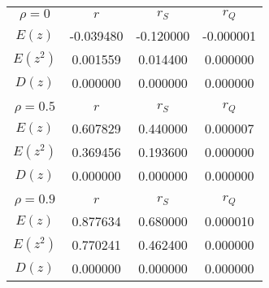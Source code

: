 \begin{table}[H]
    \centering
    \begin{tabular}{c|c|c|c}
        $$\rho=0$$ & $r$ & $r_{S}$ & $r_{Q}$ \\
        $E(z)$ & -0.039480 & -0.120000 & -0.000001 \\
        $E(z^2)$ & 0.001559 & 0.014400 & 0.000000 \\
        $D(z)$ & 0.000000 & 0.000000 & 0.000000 \\
        \hline
        \multicolumn{4}{c}{} \\
        $$\rho=0.5$$ & $r$ & $r_{S}$ & $r_{Q}$ \\
        $E(z)$ & 0.607829 & 0.440000 & 0.000007 \\
        $E(z^2)$ & 0.369456 & 0.193600 & 0.000000 \\
        $D(z)$ & 0.000000 & 0.000000 & 0.000000 \\
        \hline
        \multicolumn{4}{c}{} \\
        $$\rho=0.9$$ & $r$ & $r_{S}$ & $r_{Q}$ \\
        $E(z)$ & 0.877634 & 0.680000 & 0.000010 \\
        $E(z^2)$ & 0.770241 & 0.462400 & 0.000000 \\
        $D(z)$ & 0.000000 & 0.000000 & 0.000000 \\
    \end{tabular}
    \caption{}
    \label{}
\end{table}